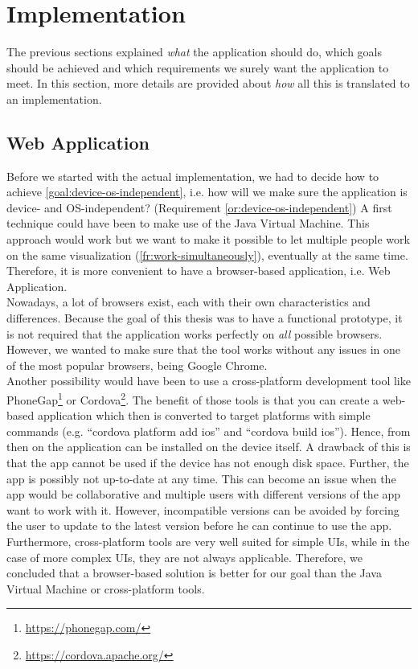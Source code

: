 \chapter{Implementation}\label{ch:implementation}

The previous sections explained \textit{what} the application should do, which goals should be achieved and which requirements we surely want the application to meet. In this section, more details are provided about \textit{how} all this is translated to an implementation.

\section{Web Application}
Before we started with the actual implementation, we had to decide how to achieve \ref{goal:device-os-independent}, i.e. how will we make sure the application is device- and OS-independent? (Requirement \ref{or:device-os-independent}) A first technique could have been to make use of the Java Virtual Machine. This approach would work but we want to make it possible to let multiple people work on the same visualization (\ref{fr:work-simultaneously}), eventually at the same time. Therefore, it is more convenient to have a browser-based application, i.e. Web Application.\\

Nowadays, a lot of browsers exist, each with their own characteristics and differences. Because the goal of this thesis was to have a functional prototype, it is not required that the application works perfectly on \textit{all} possible browsers. However, we wanted to make sure that the tool works without any issues in one of the most popular browsers, being Google Chrome.\\

Another possibility would have been to use a cross-platform development tool like PhoneGap\footnote{\url{https://phonegap.com/}} or Cordova\footnote{\url{https://cordova.apache.org/}}. The benefit of those tools is that you can create a web-based application which then is converted to target platforms with simple commands (e.g. ``cordova platform add ios'' and ``cordova build ios''). Hence, from then on the application can be installed on the device itself. A drawback of this is that the app cannot be used if the device has not enough disk space. Further, the app is possibly not up-to-date at any time. This can become an issue when the app would be collaborative and multiple users with different versions of the app want to work with it. However, incompatible versions can be avoided by forcing the user to update to the latest version before he can continue to use the app. Furthermore, cross-platform tools are very well suited for simple UIs, while in the case of more complex UIs, they are not always applicable. Therefore, we concluded that a browser-based solution is better for our goal than the Java Virtual Machine or cross-platform tools.



